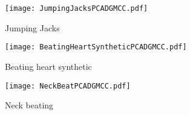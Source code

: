\documentclass[a4paper,UKenglish]{lipics}
\begin{document}
\begin{figure}[]
	\centering
	\texttt{[image: JumpingJacksPCADGMCC.pdf]}
	\caption{Jumping Jacks}
	\label{fig:JumpingJacks}
\end{figure}

\begin{figure}[]
	\centering
	\texttt{[image: BeatingHeartSyntheticPCADGMCC.pdf]}
	\caption{Beating heart synthetic}
	\label{fig:JumpingJacks}
\end{figure}


\begin{figure}[]
	\centering
	\texttt{[image: NeckBeatPCADGMCC.pdf]}
	\caption{Neck beating}
	\label{fig:NeckBeating}
\end{figure}






\end{document}
